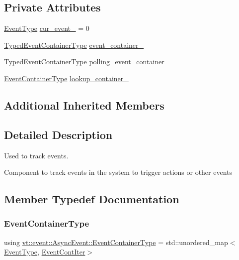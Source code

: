 \subsection*{Private Attributes}
\begin{DoxyCompactItemize}
\item 
\hyperlink{namespacevt_a009267401def7ae8bf201892222d060f}{Event\+Type} \hyperlink{structvt_1_1event_1_1_async_event_a8775e8bb7eee0344126af34897ca7612}{cur\+\_\+event\+\_\+} = 0
\item 
\hyperlink{structvt_1_1event_1_1_async_event_af0397f32fb9d7dd136c544737eeb7796}{Typed\+Event\+Container\+Type} \hyperlink{structvt_1_1event_1_1_async_event_ab976472ed1ec00878dfad854d0a74202}{event\+\_\+container\+\_\+}
\item 
\hyperlink{structvt_1_1event_1_1_async_event_af0397f32fb9d7dd136c544737eeb7796}{Typed\+Event\+Container\+Type} \hyperlink{structvt_1_1event_1_1_async_event_aa622d9e34d70a6de6ca74b16e65c1bae}{polling\+\_\+event\+\_\+container\+\_\+}
\item 
\hyperlink{structvt_1_1event_1_1_async_event_a391e9ac6236bd3dc5c884b8bc7e48257}{Event\+Container\+Type} \hyperlink{structvt_1_1event_1_1_async_event_a8810ca30cca503944aed2741a6d28430}{lookup\+\_\+container\+\_\+}
\end{DoxyCompactItemize}
\subsection*{Additional Inherited Members}


\subsection{Detailed Description}
Used to track events. 

Component to track events in the system to trigger actions or other events 

\subsection{Member Typedef Documentation}
\mbox{\label{structvt_1_1event_1_1_async_event_a391e9ac6236bd3dc5c884b8bc7e48257}} 
\subsubsection{\texorpdfstring{Event\+Container\+Type}{EventContainerType}}
{\footnotesize\ttfamily using \hyperlink{structvt_1_1event_1_1_async_event_a391e9ac6236bd3dc5c884b8bc7e48257}{vt\+::event\+::\+Async\+Event\+::\+Event\+Container\+Type} =  std\+::unordered\+\_\+map$<$\hyperlink{namespacevt_a009267401def7ae8bf201892222d060f}{Event\+Type}, \hyperlink{structvt_1_1event_1_1_async_event_a0f9634db3d6887c4a22076f6b9054e93}{Event\+Cont\+Iter}$>$}

